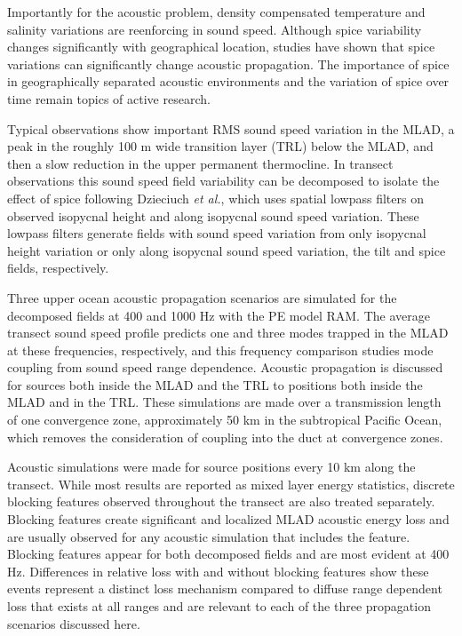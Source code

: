 \documentclass[preprint,NumberedRefs]{JASA}
\begin{document}
Importantly for the acoustic problem, density compensated temperature and salinity variations are reenforcing in sound speed. Although spice variability changes significantly with geographical location, studies have shown that spice variations can significantly change acoustic propagation\citep{colosi12,colosi13,murat2021}. The importance of spice in geographically separated acoustic environments and the variation of spice over time remain topics of active research.

Typical observations show important RMS sound speed variation in the MLAD, a peak in the roughly 100 m wide transition layer (TRL) below the MLAD, and then a slow reduction in the upper permanent thermocline. In transect observations this sound speed field variability can be decomposed to isolate the effect of spice following Dzieciuch \emph{et al.}\citep{dzieciuch2004}, which uses spatial lowpass filters on observed isopycnal height and along isopycnal sound speed variation. These lowpass filters generate fields with sound speed variation from only isopycnal height variation or only along isopycnal sound speed variation, the tilt and spice fields, respectively.

Three upper ocean acoustic propagation scenarios are simulated for the decomposed fields at 400 and 1000 Hz with the PE model RAM\cite{collins93}. The average transect sound speed profile predicts one and three modes trapped in the MLAD at these frequencies, respectively, and this frequency comparison studies mode coupling from sound speed range dependence. Acoustic propagation is discussed for sources both inside the MLAD and the TRL to positions both inside the MLAD and in the TRL. These simulations are made over a transmission length of one convergence zone\citep{jensen2011computational}, approximately 50 km in the subtropical Pacific Ocean, which removes the consideration of coupling into the duct at convergence zones\citep{colosi2020observations}.

Acoustic simulations were made for source positions every 10 km along the transect. While most results are reported as mixed layer energy statistics, discrete blocking features\citep{colosi2020observations} observed throughout the transect are also treated separately. Blocking features create significant and localized MLAD acoustic energy loss and are usually observed for any acoustic simulation that includes the feature. Blocking features appear for both decomposed fields and are most evident at 400 Hz. Differences in relative loss with and without blocking features show these events represent a distinct loss mechanism compared to diffuse range dependent loss that exists at all ranges and are relevant to each of the three propagation scenarios discussed here.
\end{document}
